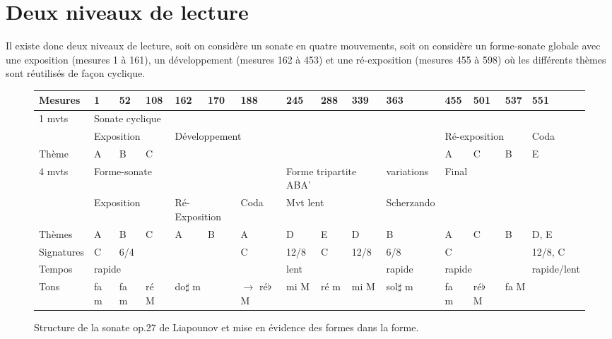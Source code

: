 \section{Deux niveaux de lecture}

Il existe donc deux niveaux de lecture, soit on considère un sonate en quatre mouvements, soit on considère un forme-sonate globale avec une exposition (mesures 1 à 161), un développement (mesures 162 à 453) et une ré-exposition (mesures 455 à 598) où les différents thèmes sont réutilisés de façon cyclique.

\begin{figure}[!p]
  \begin{bigcenter}
    \vspace{-1cm}
     {
\begin{tabular}{|l|l|l|l|l|l|l|l|l|l|l|l|l|l|l|}
 \hline
   Mesures & 1 & 52 & 108 & 162 & 170 & 188 & 245 & 288 & 339 & 363 & 455 & 501 & 537 & 551 \\
 \hline
 \hline
   1 mvts & \multicolumn{14}{|l|}{Sonate cyclique}\\
 \hline
          & \multicolumn{3}{|l|}{Exposition} & \multicolumn{7}{l|}{Développement} & \multicolumn{3}{l|}{Ré-exposition} & Coda\\
 \hline
   Thème & A & B & C & \multicolumn{7}{l|}{} & A & C & B & E\\
 \hline
 \hline
   4 mvts & \multicolumn{6}{|l|}{Forme-sonate} & \multicolumn{3}{|l|}{Forme tripartite ABA'} & variations & \multicolumn{4}{|l|}{Final}\\
 \hline
          & \multicolumn{3}{|l|}{Exposition} & \multicolumn{2}{l|}{Ré-Exposition} & Coda & \multicolumn{3}{l|}{Mvt lent} & Scherzando & \multicolumn{4}{l|}{}\\
 \hline
  Thèmes & A & B & C & A & B & A & D & E & D & B & A & C & B & D, E\\
 \hline
 \hline
  Signatures & C & \multicolumn{4}{|l|}{6/4} & C & 12/8 & C & 12/8 & 6/8 & \multicolumn{3}{|l|}{C} & 12/8, C\\
 \hline
  Tempos & \multicolumn{6}{|l|}{rapide} & \multicolumn{3}{|l|}{lent} & rapide & \multicolumn{3}{|l|}{rapide} & rapide/lent\\
 \hline
  Tons & fa m & fa m & ré M & \multicolumn{2}{|l|}{do$\sharp$ m} & $\to$ ré$\flat$ M & mi M & ré m & mi M & sol$\sharp$ m & fa m & ré$\flat$ M & \multicolumn{2}{|l|}{fa M}\\
 \hline
\end{tabular}
    }
  \end{bigcenter}
  \caption{\label{structure}Structure de la sonate op.27 de Liapounov et mise en évidence des formes dans la forme.}
\end{figure}

